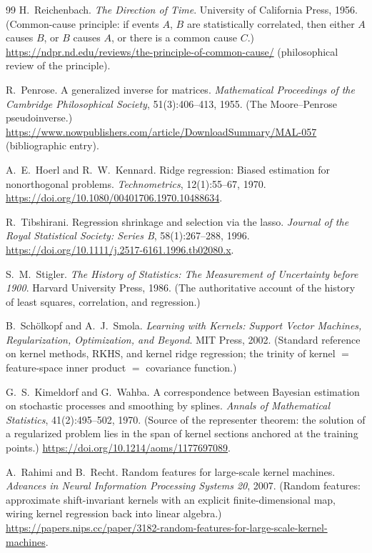 \documentclass[11pt, a4paper]{article}
\theoremstyle{plain}
\theoremstyle{definition}
\theoremstyle{remark}
\begin{document}
\begin{thebibliography}{99}
H.~Reichenbach.
\newblock \emph{The Direction of Time}.
\newblock University of California Press, 1956. (Common-cause principle: if events $A$, $B$ are statistically correlated, then either $A$ causes $B$, or $B$ causes $A$, or there is a common cause $C$.)
\newblock \url{https://ndpr.nd.edu/reviews/the-principle-of-common-cause/} (philosophical review of the principle).

R.~Penrose.
\newblock A generalized inverse for matrices.
\newblock \emph{Mathematical Proceedings of the Cambridge Philosophical Society}, 51(3):406--413, 1955. (The Moore--Penrose pseudoinverse.)
\newblock \url{https://www.nowpublishers.com/article/DownloadSummary/MAL-057} (bibliographic entry).

A.~E.~Hoerl and R.~W.~Kennard.
\newblock Ridge regression: Biased estimation for nonorthogonal problems.
\newblock \emph{Technometrics}, 12(1):55--67, 1970.
\newblock \url{https://doi.org/10.1080/00401706.1970.10488634}.

R.~Tibshirani.
\newblock Regression shrinkage and selection via the lasso.
\newblock \emph{Journal of the Royal Statistical Society: Series B}, 58(1):267--288, 1996.
\newblock \url{https://doi.org/10.1111/j.2517-6161.1996.tb02080.x}.

S.~M.~Stigler.
\newblock \emph{The History of Statistics: The Measurement of Uncertainty before 1900}.
\newblock Harvard University Press, 1986. (The authoritative account of the history of least squares, correlation, and regression.)

B.~Sch\"olkopf and A.~J.~Smola.
\newblock \emph{Learning with Kernels: Support Vector Machines, Regularization, Optimization, and Beyond}.
\newblock MIT Press, 2002. (Standard reference on kernel methods, RKHS, and kernel ridge regression; the trinity of kernel $=$ feature-space inner product $=$ covariance function.)

G.~S.~Kimeldorf and G.~Wahba.
\newblock A correspondence between Bayesian estimation on stochastic processes and smoothing by splines.
\newblock \emph{Annals of Mathematical Statistics}, 41(2):495--502, 1970. (Source of the representer theorem: the solution of a regularized problem lies in the span of kernel sections anchored at the training points.)
\newblock \url{https://doi.org/10.1214/aoms/1177697089}.

A.~Rahimi and B.~Recht.
\newblock Random features for large-scale kernel machines.
\newblock \emph{Advances in Neural Information Processing Systems 20}, 2007. (Random features: approximate shift-invariant kernels with an explicit finite-dimensional map, wiring kernel regression back into linear algebra.)
\newblock \url{https://papers.nips.cc/paper/3182-random-features-for-large-scale-kernel-machines}.


\end{thebibliography}
\end{document}
